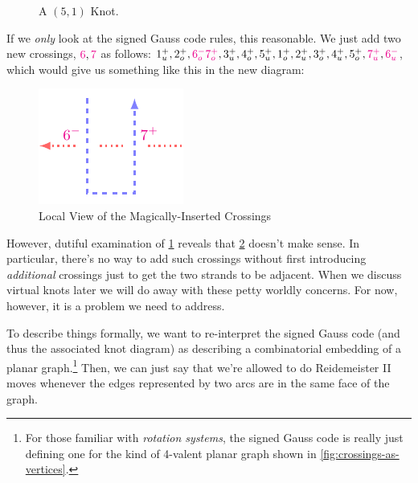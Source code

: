 \begin{note}
\begin{figure}[H]
    \caption{A $(5,1)$ Knot.}
    \label{fig:5-1-knot}
  \end{figure}
  If we \emph{only} look at the signed Gauss code rules, this reasonable. We
  just add two new crossings, ${\color{magenta}6},{\color{magenta}7}$
  as follows: $1_u^+, 2_o^+, {\color{magenta} 6_o^{-}}
  {\color{magenta} 7_o^{+}}, 3_u^+, 4_o^+, 5_u^+, 1_o^+, 2_u^+, 3_o^+,
  4_u^+, 5_o^+, {\color{magenta} 7_u^+}, {\color{magenta} 6_u^-}$,
  which would give us something like this in the new diagram:
  \begin{figure}[H]
    \centering
    \includegraphics[scale=.75]{figures/unknotting-moves-and-combinatorial-representations/illegal-r2.pdf}
    \caption{Local View of the Magically-Inserted Crossings}
    \label{fig:magically-inserted-crossings}
  \end{figure}
  However, dutiful examination of \cref{fig:5-1-knot} reveals that
  \cref{fig:magically-inserted-crossings} doesn't make sense. In
  particular, there's no way to add such crossings without first
  introducing \emph{additional} crossings just to get the two strands
  to be adjacent. When we discuss virtual knots later we will do away
  with these petty worldly concerns. For now, however, it is a problem
  we need to address.
\end{note}
To describe things formally, we want to re-interpret the signed Gauss
code (and thus the associated knot diagram) as describing a
combinatorial embedding of a planar graph.\footnote{For those familiar
  with \emph{rotation systems}, the signed Gauss code is really just
  defining one for the kind of 4-valent planar graph shown in
  \cref{fig:crossings-as-vertices}.} Then, we can just say that we're
allowed to do Reidemeister II moves whenever the edges represented by
two arcs are in the same face of the graph.

